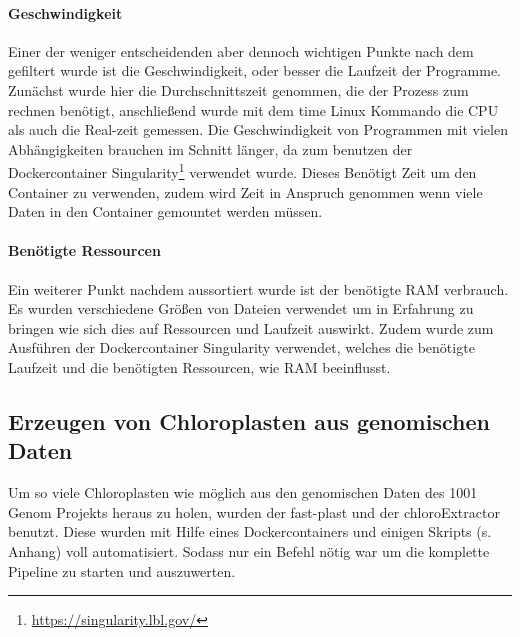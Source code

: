 \documentclass{scrartcl}
\begin{document}
\paragraph{Geschwindigkeit}
\label{sec-3-1-2-3}
Einer der weniger entscheidenden aber dennoch wichtigen Punkte nach dem gefiltert wurde ist die Geschwindigkeit, 
oder besser die Laufzeit der Programme. Zunächst wurde hier die Durchschnittszeit genommen, die der Prozess zum rechnen benötigt,
anschließend wurde mit dem time Linux Kommando die CPU als auch die Real-zeit gemessen. Die Geschwindigkeit von Programmen mit vielen Abhängigkeiten 
brauchen im Schnitt länger, da zum benutzen der Dockercontainer Singularity\footnote{\url{https://singularity.lbl.gov/}} verwendet wurde. Dieses Benötigt Zeit um den Container zu verwenden,
zudem wird Zeit in Anspruch genommen wenn viele Daten in den Container gemountet werden müssen.
\paragraph{Benötigte Ressourcen}
\label{sec-3-1-2-4}
Ein weiterer Punkt nachdem aussortiert wurde ist der benötigte RAM verbrauch. Es wurden verschiedene Größen von Dateien verwendet
um in Erfahrung zu bringen wie sich dies auf Ressourcen und Laufzeit auswirkt. Zudem wurde zum Ausführen der Dockercontainer 
Singularity \footnotemark[49]{} verwendet, welches die benötigte Laufzeit und die benötigten Ressourcen, wie RAM beeinflusst.


\subsection{Erzeugen von Chloroplasten aus genomischen Daten}
\label{sec-3-2}
Um so viele Chloroplasten wie möglich aus den genomischen Daten des 1001 Genom Projekts heraus zu holen, wurden der fast-plast und der chloroExtractor benutzt.
Diese wurden mit Hilfe eines Dockercontainers und einigen Skripts (s. Anhang) voll automatisiert. Sodass nur ein Befehl nötig war um die komplette 
Pipeline zu starten und auszuwerten. 
\end{document}
